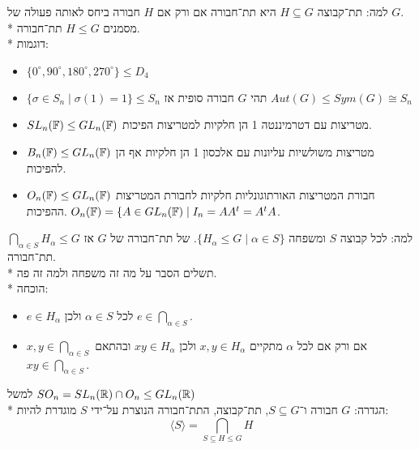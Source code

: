 למה: תת־קבוצה $H \subseteq G$ היא תת־חבורה אם ורק אם $H$ חבורה ביחס לאותה פעולה של $G$. \\*
מסמנים $H \le G$ תת־חבורה. \\*
דוגמות:
\begin{itemize}
	\item $\{ 0^\circ, 90^\circ, 180^\circ, 270^\circ \} \le D_4$
	\item $\{ \sigma \in S_n \mid \sigma(1) = 1 \} \le S_n$
		\subitem{-} תהי $G$ חבורה סופית אז $Aut(G) \le Sym(G) \cong S_n$
	\item $SL_n(\mathbb{F}) \le GL_n(\mathbb{F})$ מטריצות עם דטרמיננטה 1 הן חלקיות למטריצות הפיכות.
	\item $B_n(\mathbb{F}) \le GL_n(\mathbb{F})$ מטריצות משולשיות עליונות עם אלכסון 1 הן חלקיות אף הן להפיכות.
	\item $O_n(\mathbb{F}) \le GL_n(\mathbb{F})$ חבורת המטריצות האורתוגונליות חלקיות לחבורת המטריצות ההפיכות. $O_n(\mathbb{F}) = \{ A \in GL_n(\mathbb{F}) \mid I_n = AA^t = A^t A$.
\end{itemize}
למה: לכל קבוצה $S$ ומשפחה $\{ H_\alpha \le G \mid \alpha \in S\}$. של תת־חבורה של $G$ אז $\bigcap_{\alpha \in S} H_\alpha \le G$ תת־חבורה. \\*
תשלים הסבר על מה זה משפחה ולמה זה פה. \\*
הוכחה:
\begin{itemize}
	\item $e \in H_\alpha$ לכל $\alpha \in S$ ולכן $e \in \bigcap_{\alpha \in S}$.
	\item $x, y \in \bigcap_{\alpha \in S}$ אם ורק אם לכל $\alpha$ מתקיים $x, y \in H_\alpha$ ולכן $xy \in H_\alpha$ ובהתאם $xy \in \bigcap_{\alpha \in S}$.
\end{itemize}
למשל $SO_n = SL_n(\mathbb{R}) \cap O_n \le GL_n(\mathbb{R})$ \\*
הגדרה: $G$ חבורה ו־$S \subseteq G$, תת־קבוצה, התת־חבורה הנוצרת על־ידי $S$ מוגדרת להיות:
\[
	\langle S \rangle = \bigcap_{S \subseteq H \le G} H
\]


